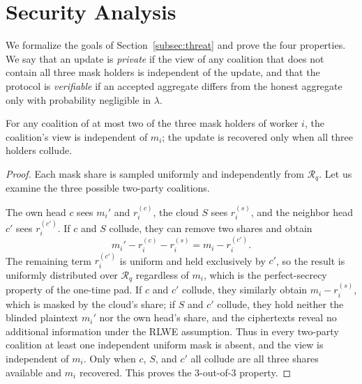 \section{Security Analysis}
\label{sec:security}

We formalize the goals of Section~\ref{subsec:threat} and prove the four properties. We say that an update is \emph{private} if the view of any coalition that does not contain all three mask holders is independent of the update, and that the protocol is \emph{verifiable} if an accepted aggregate differs from the honest aggregate only with probability negligible in $\lambda$.

\begin{theorem}
\label{thm:worker-privacy}
For any coalition of at most two of the three mask holders of worker $i$, the coalition's view is independent of $m_i$; the update is recovered only when all three holders collude.
\end{theorem}
\begin{proof}
Each mask share is sampled uniformly and independently from $\mathcal{R}_q$. Let us examine the three possible two-party coalitions.

The own head $c$ sees $m_i'$ and $r_i^{(c)}$, the cloud $S$ sees $r_i^{(s)}$, and the neighbor head $c'$ sees $r_i^{(c')}$. If $c$ and $S$ collude, they can remove two shares and obtain
\begin{equation}
  m_i' - r_i^{(c)} - r_i^{(s)} = m_i - r_i^{(c')} .
\end{equation}
The remaining term $r_i^{(c')}$ is uniform and held exclusively by $c'$, so the result is uniformly distributed over $\mathcal{R}_q$ regardless of $m_i$, which is the perfect-secrecy property of the one-time pad. If $c$ and $c'$ collude, they similarly obtain $m_i-r_i^{(s)}$, which is masked by the cloud's share; if $S$ and $c'$ collude, they hold neither the blinded plaintext $m_i'$ nor the own head's share, and the ciphertexts reveal no additional information under the RLWE assumption. Thus in every two-party coalition at least one independent uniform mask is absent, and the view is independent of $m_i$. Only when $c$, $S$, and $c'$ all collude are all three shares available and $m_i$ recovered. This proves the 3-out-of-3 property.
\end{proof}

